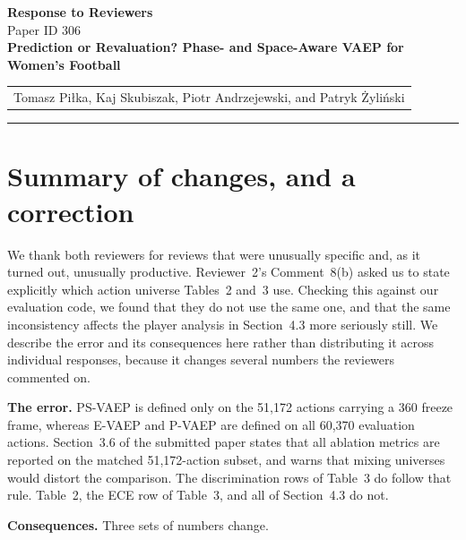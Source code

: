 \documentclass[11pt,a4paper]{article}
\begin{document}
\begin{center}
  {\LARGE\bfseries\color{navy} Response to Reviewers}\\[5pt]
  {\large Paper ID 306}\\[10pt]
  {\Large\bfseries Prediction or Revaluation? Phase- and Space-Aware VAEP for Women's Football}\\[8pt]
    \begin{tabular}{@{}l@{}}
  Tomasz Piłka, Kaj Skubiszak, Piotr Andrzejewski, and Patryk Żyliński
  \end{tabular}
\end{center}
\vspace{4mm}
\hrule
\vspace{5mm}

\section{Summary of changes, and a correction}

We thank both reviewers for reviews that were unusually specific and, as it turned out,
unusually productive. Reviewer~2's Comment~8(b) asked us to state explicitly which action
universe Tables~2 and~3 use. Checking this against our evaluation code, we found that they
do not use the same one, and that the same inconsistency affects the player analysis in
Section~4.3 more seriously still. We describe the error and its consequences here rather
than distributing it across individual responses, because it changes several numbers the
reviewers commented on.

\textbf{The error.} PS-VAEP is defined only on the 51{,}172 actions carrying a 360 freeze
frame, whereas E-VAEP and P-VAEP are defined on all 60{,}370 evaluation actions.
Section~3.6 of the submitted paper states that all ablation metrics are reported on the
matched 51{,}172-action subset, and warns that mixing universes would distort the
comparison. The discrimination rows of Table~3 do follow that rule. Table~2, the ECE row
of Table~3, and all of Section~4.3 do not.

\textbf{Consequences.} Three sets of numbers change.
\end{document}
